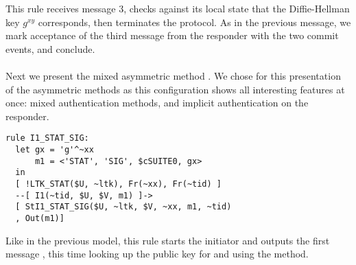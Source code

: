This rule receives message 3, checks against its local state that the
Diffie-Hellman key $g^{xy}$ corresponds, then terminates the protocol.  As in
the previous message, we mark acceptance of the third message from the responder
with the two commit events, and conclude.


\paragraph{\mStatSig{}}
Next we present the mixed asymmetric method \mStatSig. We chose \mStatSig{} for
this presentation of the asymmetric methods as this configuration shows all
interesting features at once: mixed authentication methods, and implicit
authentication on the responder.

\begin{lstlisting}
rule I1_STAT_SIG:
  let gx = 'g'^~xx
      m1 = <'STAT', 'SIG', $cSUITE0, gx> 
  in
  [ !LTK_STAT($U, ~ltk), Fr(~xx), Fr(~tid) ]
  --[ I1(~tid, $U, $V, m1) ]->
  [ StI1_STAT_SIG($U, ~ltk, $V, ~xx, m1, ~tid) 
  , Out(m1)]
\end{lstlisting}
Like in the previous model, this rule starts the initiator and outputs the first
message , this time looking up the public key for  and using the
\mStatSig{} method.

